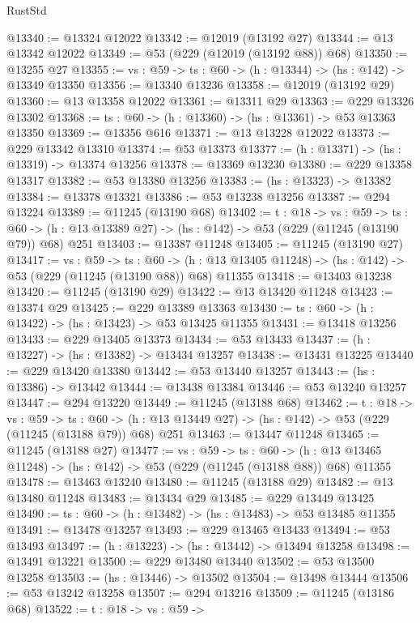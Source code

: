 \begin{lexlean}{RustStd}
\begin{coremodule}
@13340 := @13324 @12022
@13342 := @12019 (@13192 @27)
@13344 := @13 @13342 @12022
@13349 := @53 (@229 (@12019 (@13192 @88)) @68)
@13350 := @13255 @27
@13355 := {vs : @59} -> {ts : @60} -> (h : @13344) -> (hs : @142) -> @13349 @13350
@13356 := @13340 @13236
@13358 := @12019 (@13192 @29)
@13360 := @13 @13358 @12022
@13361 := @13311 @29
@13363 := @229 @13326 @13302
@13368 := {ts : @60} -> (h : @13360) -> (hs : @13361) -> @53 @13363 @13350
@13369 := @13356 @616
@13371 := @13 @13228 @12022
@13373 := @229 @13342 @13310
@13374 := @53 @13373
@13377 := (h : @13371) -> (hs : @13319) -> @13374 @13256
@13378 := @13369 @13230
@13380 := @229 @13358 @13317
@13382 := @53 @13380 @13256
@13383 := (hs : @13323) -> @13382
@13384 := @13378 @13321
@13386 := @53 @13238 @13256
@13387 := @294 @13224
@13389 := @11245 (@13190 @68)
@13402 := {t : @18} ->
  {vs : @59} ->
  {ts : @60} -> (h : @13 @13389 @27) -> (hs : @142) -> @53 (@229 (@11245 (@13190 @79)) @68) @251
@13403 := @13387 @11248
@13405 := @11245 (@13190 @27)
@13417 := {vs : @59} ->
  {ts : @60} ->
  (h : @13 @13405 @11248) -> (hs : @142) -> @53 (@229 (@11245 (@13190 @88)) @68) @11355
@13418 := @13403 @13238
@13420 := @11245 (@13190 @29)
@13422 := @13 @13420 @11248
@13423 := @13374 @29
@13425 := @229 @13389 @13363
@13430 := {ts : @60} -> (h : @13422) -> (hs : @13423) -> @53 @13425 @11355
@13431 := @13418 @13256
@13433 := @229 @13405 @13373
@13434 := @53 @13433
@13437 := (h : @13227) -> (hs : @13382) -> @13434 @13257
@13438 := @13431 @13225
@13440 := @229 @13420 @13380
@13442 := @53 @13440 @13257
@13443 := (hs : @13386) -> @13442
@13444 := @13438 @13384
@13446 := @53 @13240 @13257
@13447 := @294 @13220
@13449 := @11245 (@13188 @68)
@13462 := {t : @18} ->
  {vs : @59} ->
  {ts : @60} -> (h : @13 @13449 @27) -> (hs : @142) -> @53 (@229 (@11245 (@13188 @79)) @68) @251
@13463 := @13447 @11248
@13465 := @11245 (@13188 @27)
@13477 := {vs : @59} ->
  {ts : @60} ->
  (h : @13 @13465 @11248) -> (hs : @142) -> @53 (@229 (@11245 (@13188 @88)) @68) @11355
@13478 := @13463 @13240
@13480 := @11245 (@13188 @29)
@13482 := @13 @13480 @11248
@13483 := @13434 @29
@13485 := @229 @13449 @13425
@13490 := {ts : @60} -> (h : @13482) -> (hs : @13483) -> @53 @13485 @11355
@13491 := @13478 @13257
@13493 := @229 @13465 @13433
@13494 := @53 @13493
@13497 := (h : @13223) -> (hs : @13442) -> @13494 @13258
@13498 := @13491 @13221
@13500 := @229 @13480 @13440
@13502 := @53 @13500 @13258
@13503 := (hs : @13446) -> @13502
@13504 := @13498 @13444
@13506 := @53 @13242 @13258
@13507 := @294 @13216
@13509 := @11245 (@13186 @68)
@13522 := {t : @18} ->
  {vs : @59} ->

\end{coremodule}
\end{lexlean}
